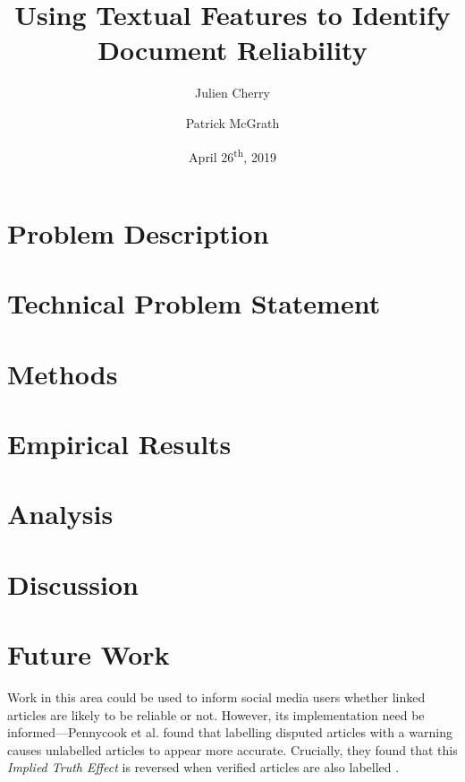 \documentclass[12pt]{article}
\title{Using Textual Features to Identify Document Reliability}
\author{Julien Cherry \and Patrick McGrath}
\date{April 26\textsuperscript{th}, 2019}
\begin{document}
	\maketitle
	\section{Problem Description}
	\section{Technical Problem Statement}
	\section{Methods}
	\section{Empirical Results}
	\section{Analysis}
	\section{Discussion}


	\section{Future Work}

	Work in this area could be used to inform social media users whether linked articles are likely to be reliable or not. However, its implementation need be informed---Pennycook et al. found that labelling disputed articles with a warning causes unlabelled articles to appear more accurate. Crucially, they found that this \textit{Implied Truth Effect} is reversed when verified articles are also labelled \cite{pennycook}.

	
	
\end{document}

